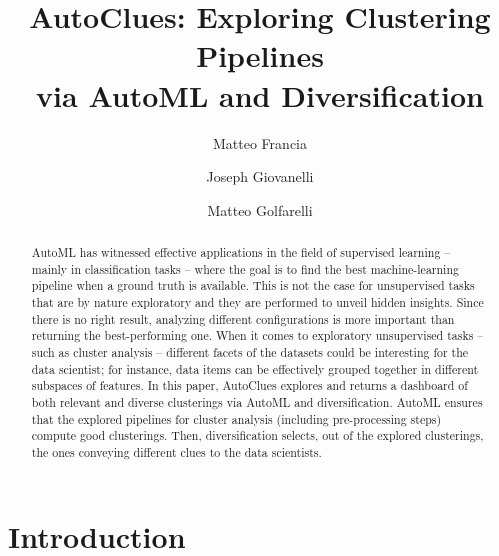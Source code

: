 \documentclass[runningheads]{llncs}
\begin{document}
\sloppy

\title{AutoClues: Exploring Clustering Pipelines \\via AutoML and Diversification}



\author{Matteo Francia \and
Joseph Giovanelli \and
Matteo Golfarelli}



\maketitle

\begin{abstract}
AutoML has witnessed effective applications in the field of supervised learning -- mainly in classification tasks --  where the goal is to find the best machine-learning pipeline when a ground truth is available.
This is not the case for unsupervised tasks that are by nature exploratory and they are performed to unveil hidden insights. 
Since there is no right result, analyzing different configurations is more important than returning the best-performing one.
When it comes to exploratory unsupervised tasks -- such as cluster analysis --  different facets of the datasets could be interesting for the data scientist; for instance, data items can be effectively grouped together in different subspaces of features.
In this paper, AutoClues explores and returns a dashboard of both relevant and diverse clusterings via AutoML and diversification.
AutoML ensures that the explored pipelines for cluster analysis (including pre-processing steps) compute good clusterings.
Then, diversification selects, out of the explored clusterings, the ones conveying different clues to the data scientists.
\end{abstract}

\section{Introduction}\label{sec:intro}
\end{document}

